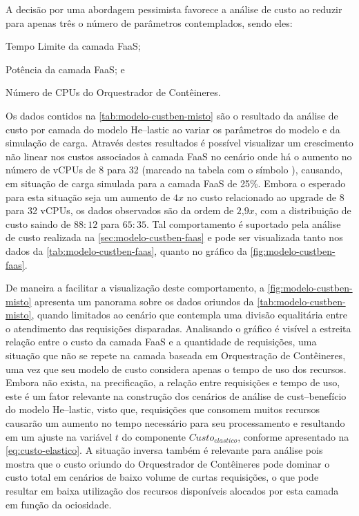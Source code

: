 \documentclass[english,brazilian]{UNISINOSmonografia} %
\begin{document}
A decisão por uma abordagem pessimista favorece a análise de custo ao reduzir para apenas três o número de parâmetros contemplados, sendo eles: 
\begin{inparaenum}[(i)]
	\item Tempo Limite da camada FaaS;
	\item Potência da camada FaaS; e
	\item Número de CPUs do Orquestrador de Contêineres.
\end{inparaenum}
Os dados contidos na \autoref{tab:modelo-custben-misto} são o resultado da análise de custo por camada do modelo \textsf{He}--lastic ao variar os parâmetros do modelo e da simulação de carga.
Através destes resultados é possível visualizar um crescimento não linear nos custos associados à camada FaaS no cenário onde há o aumento no número de vCPUs de 8 para 32 (marcado na tabela com o símbolo \dag), causando, em situação de carga simulada para a camada FaaS de 25\%.
Embora o esperado para esta situação seja um aumento de $4x$ no custo relacionado ao upgrade de 8 para 32 vCPUs, os dados observados são da ordem de $2\text{,}9x$, com a distribuição de custo saindo de $88:12$ para $65:35$.
Tal comportamento é suportado pela análise de custo realizada na \autoref{sec:modelo-custben-faas} e pode ser visualizada tanto nos dados da \autoref{tab:modelo-custben-faas}, quanto no gráfico da \autoref{fig:modelo-custben-faas}.



De maneira a facilitar a visualização deste comportamento, a \autoref{fig:modelo-custben-misto} apresenta um panorama sobre os dados oriundos da \autoref{tab:modelo-custben-misto}, quando limitados ao cenário que contempla uma divisão equalitária entre o atendimento das requisições disparadas.
Analisando o gráfico é visível a estreita relação entre o custo da camada FaaS e a quantidade de requisições, uma situação que não se repete na camada baseada em Orquestração de Contêineres, uma vez que seu modelo de custo considera apenas o tempo de uso dos recursos.
Embora não exista, na precificação, a relação entre requisições e tempo de uso, este é um fator relevante na construção dos cenários de análise de cust--benefício do modelo \textsf{He}--lastic, visto que, requisições que consomem muitos recursos causarão um aumento no tempo necessário para seu processamento e resultando em um ajuste na variável $t$ do componente $Custo_{elastico}$, conforme apresentado na \autoref{eq:custo-elastico}.
A situação inversa também é relevante para análise pois mostra que o custo oriundo do Orquestrador de Contêineres pode dominar o custo total em cenários de baixo volume de curtas requisições, o que pode resultar em baixa utilização dos recursos disponíveis alocados por esta camada em função da ociosidade.
\end{document}
